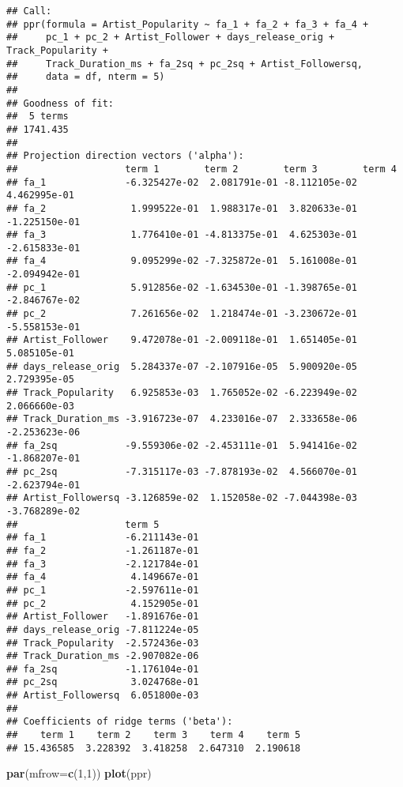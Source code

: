 \documentclass[
]{article}
\newenvironment{Shaded}{\begin{snugshade}}{\end{snugshade}}
\newcommand{\DataTypeTok}[1]{\textcolor[rgb]{0.13,0.29,0.53}{#1}}
\newcommand{\DecValTok}[1]{\textcolor[rgb]{0.00,0.00,0.81}{#1}}
\newcommand{\KeywordTok}[1]{\textcolor[rgb]{0.13,0.29,0.53}{\textbf{#1}}}
\newcommand{\NormalTok}[1]{#1}
\begin{document}
\begin{verbatim}
## Call:
## ppr(formula = Artist_Popularity ~ fa_1 + fa_2 + fa_3 + fa_4 + 
##     pc_1 + pc_2 + Artist_Follower + days_release_orig + Track_Popularity + 
##     Track_Duration_ms + fa_2sq + pc_2sq + Artist_Followersq, 
##     data = df, nterm = 5)
## 
## Goodness of fit:
##  5 terms 
## 1741.435 
## 
## Projection direction vectors ('alpha'):
##                   term 1        term 2        term 3        term 4       
## fa_1              -6.325427e-02  2.081791e-01 -8.112105e-02  4.462995e-01
## fa_2               1.999522e-01  1.988317e-01  3.820633e-01 -1.225150e-01
## fa_3               1.776410e-01 -4.813375e-01  4.625303e-01 -2.615833e-01
## fa_4               9.095299e-02 -7.325872e-01  5.161008e-01 -2.094942e-01
## pc_1               5.912856e-02 -1.634530e-01 -1.398765e-01 -2.846767e-02
## pc_2               7.261656e-02  1.218474e-01 -3.230672e-01 -5.558153e-01
## Artist_Follower    9.472078e-01 -2.009118e-01  1.651405e-01  5.085105e-01
## days_release_orig  5.284337e-07 -2.107916e-05  5.900920e-05  2.729395e-05
## Track_Popularity   6.925853e-03  1.765052e-02 -6.223949e-02  2.066660e-03
## Track_Duration_ms -3.916723e-07  4.233016e-07  2.333658e-06 -2.253623e-06
## fa_2sq            -9.559306e-02 -2.453111e-01  5.941416e-02 -1.868207e-01
## pc_2sq            -7.315117e-03 -7.878193e-02  4.566070e-01 -2.623794e-01
## Artist_Followersq -3.126859e-02  1.152058e-02 -7.044398e-03 -3.768289e-02
##                   term 5       
## fa_1              -6.211143e-01
## fa_2              -1.261187e-01
## fa_3              -2.121784e-01
## fa_4               4.149667e-01
## pc_1              -2.597611e-01
## pc_2               4.152905e-01
## Artist_Follower   -1.891676e-01
## days_release_orig -7.811224e-05
## Track_Popularity  -2.572436e-03
## Track_Duration_ms -2.907082e-06
## fa_2sq            -1.176104e-01
## pc_2sq             3.024768e-01
## Artist_Followersq  6.051800e-03
## 
## Coefficients of ridge terms ('beta'):
##    term 1    term 2    term 3    term 4    term 5 
## 15.436585  3.228392  3.418258  2.647310  2.190618
\end{verbatim}

\begin{Shaded}
\begin{Highlighting}[]
\KeywordTok{par}\NormalTok{(}\DataTypeTok{mfrow=}\KeywordTok{c}\NormalTok{(}\DecValTok{1}\NormalTok{,}\DecValTok{1}\NormalTok{))}
\KeywordTok{plot}\NormalTok{(ppr)}
\end{Highlighting}
\end{Shaded}
\end{document}
